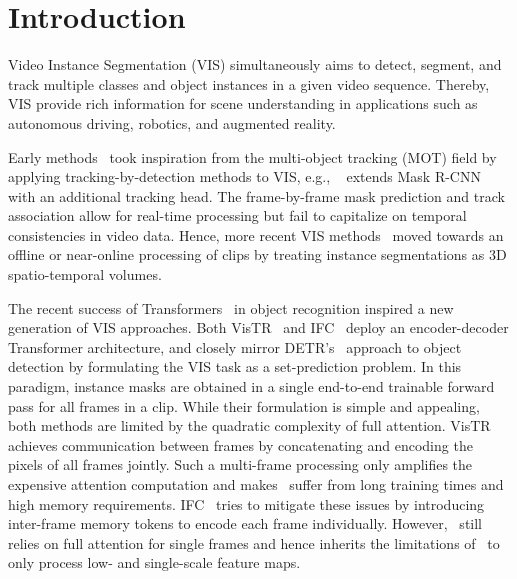 \documentclass[runningheads]{llncs}
\newcommand{\detr}{\mbox{DETR}}
\newcommand{\vistr}{\mbox{VisTR}}
\newcommand{\eg}{e.g.}
\begin{document}
\section{Introduction}
Video Instance Segmentation (VIS) simultaneously aims to detect, segment, and track multiple classes and object instances in a given video sequence. Thereby, VIS provide rich information for scene understanding in applications such as autonomous driving, robotics, and augmented reality.


Early methods~\cite{Yang2019vis,sip_mask,cross_vis} took inspiration from the multi-object tracking (MOT) field by applying tracking-by-detection methods to VIS, \eg, ~\cite{Yang2019vis} extends Mask R-CNN~\cite{he2017mask} with an additional tracking head.
The frame-by-frame mask prediction and track association allow for real-time processing but fail to capitalize on temporal consistencies in video data.
Hence, more recent VIS methods~\cite{stem_seg,mask_prop,prop_reduce,stmask,sg_net} moved towards an offline or near-online processing of clips by treating instance segmentations as 3D spatio-temporal volumes.

The recent success of Transformers~\cite{attention_is_all_you_need} in object recognition
inspired a new generation of VIS approaches.
Both \vistr{}~\cite{vistr} and IFC~\cite{IFC} deploy an encoder-decoder Transformer architecture, and closely mirror \detr{}'s~\cite{DETR} approach to object detection by formulating the VIS task as a set-prediction problem.
In this paradigm, instance masks are obtained in a single end-to-end trainable forward pass for all frames in a clip.
While their formulation is simple and appealing, both methods are limited by the quadratic complexity of full attention. 
\vistr{} achieves communication between frames by concatenating and encoding the pixels of all frames jointly. 
Such a multi-frame processing only amplifies the expensive attention computation and makes~\cite{vistr} suffer from long training times and high memory requirements.
IFC~\cite{IFC} tries to mitigate these issues by introducing inter-frame memory tokens to encode each frame individually.
However,~\cite{IFC} still relies on full attention for single frames and hence inherits the limitations of~\cite{DETR,vistr} to only process low- and single-scale feature maps.
\end{document}
